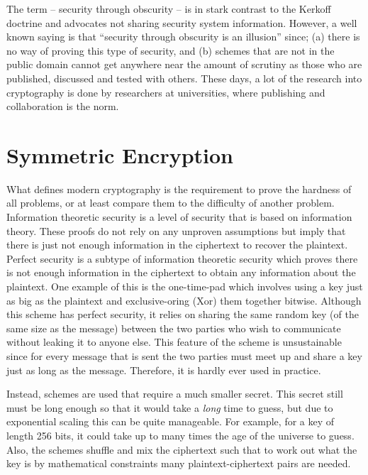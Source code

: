 \documentclass[ %
                    author={Samuel Russell},
                supervisor={Prof. Bogdan Warinschi},
                    degree={MEng},
                     title={Innocuous Ciphertexts},
                  subtitle={The DE-CENSOR Scheme},
                      type={research},
                      year={2018} ]{dissertation}
\begin{document}
The term -- security through obscurity -- is in stark contrast to the Kerkoff doctrine and advocates not sharing security system information.
However, a well known saying is that ``security through obscurity is an illusion'' since; (a) there is no way of proving this type of security, and (b) schemes that are not in the public domain cannot get anywhere near the amount of scrutiny as those who are published, discussed and tested with others.
These days, a lot of the research into cryptography is done by researchers at universities, where publishing and collaboration is the norm.

\section{Symmetric Encryption}

What defines modern cryptography is the requirement to prove the hardness of all problems, or at least compare them to the difficulty of another problem.
Information theoretic security is a level of security that is based on information theory.
These proofs do not rely on any unproven assumptions but imply that there is just not enough information in the ciphertext to recover the plaintext.
Perfect security is a subtype of information theoretic security which proves there is not enough information in the ciphertext to obtain any information about the plaintext.
One example of this is the one-time-pad which involves using a key just as big as the plaintext and exclusive-oring (Xor) them together bitwise.
Although this scheme has perfect security, it relies on sharing the same random key (of the same size as the message) between the two parties who wish to communicate without leaking it to anyone else.
This feature of the scheme is unsustainable since for every message that is sent the two parties must meet up and share a key just as long as the message.
Therefore, it is hardly ever used in practice.

Instead, schemes are used that require a much smaller secret.
This secret still must be long enough so that it would take a \textit{long} time to guess, but due to exponential scaling this can be quite manageable.
For example, for a key of length 256 bits, it could take up to many times the age of the universe to guess.
Also, the schemes shuffle and mix the ciphertext such that to work out what the key is by mathematical constraints many plaintext-ciphertext pairs are needed.
\end{document}
